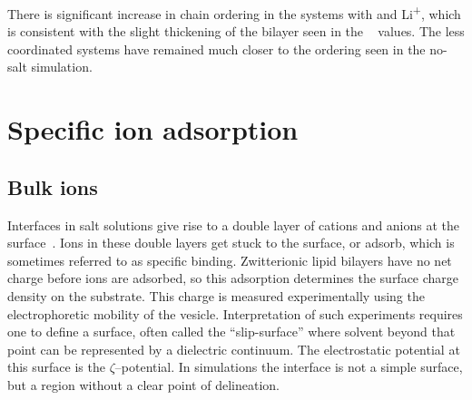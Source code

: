 There is significant increase in chain ordering in the systems 
with \na and Li\textsuperscript{+}, which {is} consistent with the slight thickening
of the bilayer seen in the \db~ values. The less coordinated \mg systems have remained much closer to the 
ordering seen in the no-salt simulation.


\section{Specific ion adsorption}
\subsection{Bulk ions}

Interfaces in salt solutions give rise to a double layer of cations and anions at the surface~\cite{israelachvili:2011:intermol}. 
Ions in these double layers get stuck to the surface, or adsorb, which is sometimes referred to as specific binding. Zwitterionic lipid bilayers have no net charge before ions are adsorbed,
so this adsorption
determines the surface charge density on the substrate. This charge is measured experimentally using the electrophoretic mobility of the vesicle. Interpretation
of such experiments requires one to define a surface, often called the ``slip-surface'' where solvent 
beyond that point
can be represented by a dielectric continuum. The electrostatic potential at this surface is the $\zeta$--potential.
In simulations the interface is not a simple surface, but a region {without a clear point of delineation}. 

